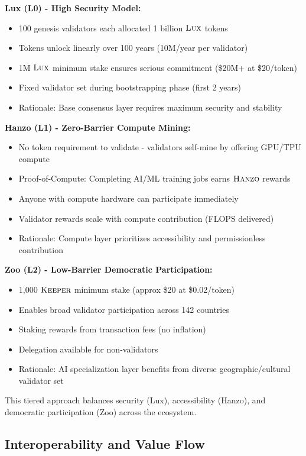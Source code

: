 \documentclass[11pt,letterpaper]{article}
\theoremstyle{definition}
\theoremstyle{remark}
\newcommand{\KEEPER}{\textsc{Keeper}}
\newcommand{\Hanzo}{\textsc{Hanzo}}
\newcommand{\Lux}{\textsc{Lux}}
\begin{document}
\textbf{Lux (L0) - High Security Model:}
\begin{itemize}
\item 100 genesis validators each allocated 1 billion $\Lux$ tokens
\item Tokens unlock linearly over 100 years (10M/year per validator)
\item 1M $\Lux$ minimum stake ensures serious commitment (\$20M+ at \$20/token)
\item Fixed validator set during bootstrapping phase (first 2 years)
\item Rationale: Base consensus layer requires maximum security and stability
\end{itemize}

\textbf{Hanzo (L1) - Zero-Barrier Compute Mining:}
\begin{itemize}
\item No token requirement to validate - validators self-mine by offering GPU/TPU compute
\item Proof-of-Compute: Completing AI/ML training jobs earns $\Hanzo$ rewards
\item Anyone with compute hardware can participate immediately
\item Validator rewards scale with compute contribution (FLOPS delivered)
\item Rationale: Compute layer prioritizes accessibility and permissionless contribution
\end{itemize}

\textbf{Zoo (L2) - Low-Barrier Democratic Participation:}
\begin{itemize}
\item 1,000 $\KEEPER$ minimum stake (approx \$20 at \$0.02/token)
\item Enables broad validator participation across 142 countries
\item Staking rewards from transaction fees (no inflation)
\item Delegation available for non-validators
\item Rationale: AI specialization layer benefits from diverse geographic/cultural validator set
\end{itemize}

This tiered approach balances security (Lux), accessibility (Hanzo), and democratic participation (Zoo) across the ecosystem.

\subsection{Interoperability and Value Flow}
\end{document}

